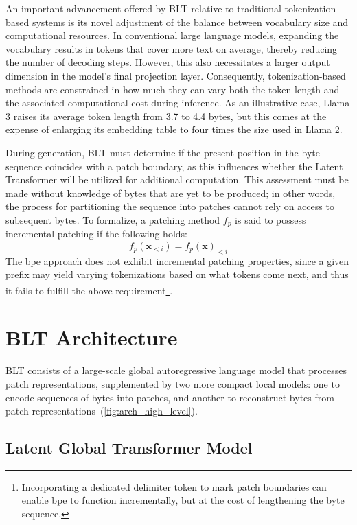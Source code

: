 An important advancement offered by {\textsc BLT} relative to traditional tokenization-based systems is its novel adjustment of the balance between vocabulary size and computational resources. In conventional large language models, expanding the vocabulary results in tokens that cover more text on average, thereby reducing the number of decoding steps. However, this also necessitates a larger output dimension in the model's final projection layer. Consequently, tokenization-based methods are constrained in how much they can vary both the token length and the associated computational cost during inference. As an illustrative case, Llama 3 raises its average token length from 3.7 to 4.4 bytes, but this comes at the expense of enlarging its embedding table to four times the size used in Llama 2.

During generation, {\textsc BLT} must determine if the present position in the byte sequence coincides with a patch boundary, as this influences whether the Latent Transformer will be utilized for additional computation. This assessment must be made without knowledge of bytes that are yet to be produced; in other words, the process for partitioning the sequence into patches cannot rely on access to subsequent bytes. To formalize, a patching method $f_p$ is said to possess incremental patching if the following holds:
$$f_p(\pmb{x}_{<i}) = f_p(\pmb{x})_{<i}$$
The bpe approach does not exhibit incremental patching properties, since a given prefix may yield varying tokenizations based on what tokens come next, and thus it fails to fulfill the above requirement\footnote{Incorporating a dedicated delimiter token to mark patch boundaries can enable bpe to function incrementally, but at the cost of lengthening the byte sequence.}.

\section{{\textsc BLT} Architecture}
\label{section:architecture}
{\textsc BLT} consists of a large-scale global autoregressive language model that processes patch representations, supplemented by two more compact local models: one to encode sequences of bytes into patches, and another to reconstruct bytes from patch representations~(\autoref{fig:arch_high_level}).

\subsection{Latent Global Transformer Model}

